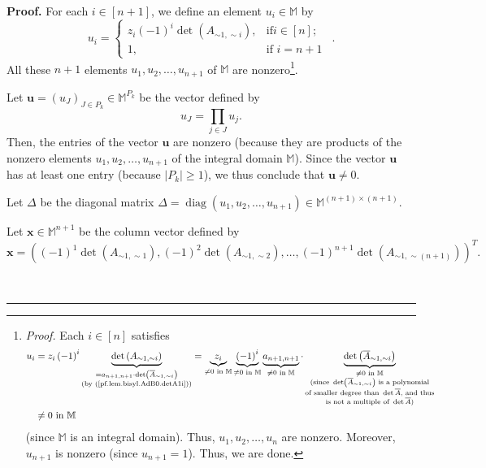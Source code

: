 \documentclass[numbers=enddot,12pt,final,onecolumn,notitlepage]{scrartcl}%
\theoremstyle{definition}
\newenvironment{proof}[1][Proof]{\noindent\textbf{#1.} }{\ \rule{0.5em}{0.5em}}
\let\prodnonlimits\prod
\renewcommand{\prod}{\prodnonlimits\limits}
\begin{document}
\begin{proof}
For each $i\in\left[  n+1\right]  $, we define an element $u_{i}\in\mathbb{M}$
by%
\[
u_{i}=%
\begin{cases}
z_{i}\left(  -1\right)  ^{i}\det\left(  A_{\sim1,\sim i}\right)  , & \text{if
}i\in\left[  n\right]  ;\\
1, & \text{if }i=n+1
\end{cases}
\ \ .
\]
All these $n+1$ elements $u_{1},u_{2},\ldots,u_{n+1}$ of $\mathbb{M}$ are
nonzero\footnote{\textit{Proof.} Each $i\in\left[  n\right]  $ satisfies%
\begin{align*}
u_{i}  &  =z_{i}\left(  -1\right)  ^{i}\underbrace{\det\left(  A_{\sim1,\sim
i}\right)  }_{\substack{=a_{n+1,n+1}\cdot\det\left(  \overline{A}_{\sim1,\sim
i}\right)  \\\text{(by (\ref{pf.lem.bisyl.AdB0.detA1i}))}}}=\underbrace{z_{i}%
}_{\neq0\text{ in }\mathbb{M}}\underbrace{\left(  -1\right)  ^{i}}%
_{\neq0\text{ in }\mathbb{M}}\underbrace{a_{n+1,n+1}}_{\neq0\text{ in
}\mathbb{M}}\cdot\underbrace{\det\left(  \overline{A}_{\sim1,\sim i}\right)
}_{\substack{\neq0\text{ in }\mathbb{M}\\\text{(since }\det\left(
\overline{A}_{\sim1,\sim i}\right)  \text{ is a polynomial}\\\text{of smaller
degree than }\det\overline{A}\text{, and thus}\\\text{is not a multiple of
}\det\overline{A}\text{)}}}\\
&  \neq0\text{ in }\mathbb{M}%
\end{align*}
(since $\mathbb{M}$ is an integral domain). Thus, $u_{1},u_{2},\ldots,u_{n}$
are nonzero. Moreover, $u_{n+1}$ is nonzero (since $u_{n+1}=1$). Thus, we are
done.}.

Let $\mathbf{u}=\left(  u_{J}\right)  _{J\in P_{k}}\in\mathbb{M}^{P_{k}}$ be
the vector defined by%
\[
u_{J}=\prod_{j\in J}u_{j}.
\]
Then, the entries of the vector $\mathbf{u}$ are nonzero (because they are
products of the nonzero elements $u_{1},u_{2},\ldots,u_{n+1}$ of the integral
domain $\mathbb{M}$). Since the vector $\mathbf{u}$ has at least one entry
(because $\left\vert P_{k}\right\vert \geq1$), we thus conclude that
$\mathbf{u}\neq0$.

Let $\Delta$ be the diagonal matrix $\Delta=\operatorname*{diag}\left(
u_{1},u_{2},\ldots,u_{n+1}\right)  \in\mathbb{M}^{\left(  n+1\right)
\times\left(  n+1\right)  }$.

Let $\mathbf{x}\in\mathbb{M}^{n+1}$ be the column vector defined by%
\[
\mathbf{x}=\left(  \left(  -1\right)  ^{1}\det\left(  A_{\sim1,\sim1}\right)
,\left(  -1\right)  ^{2}\det\left(  A_{\sim1,\sim2}\right)  ,\ldots,\left(
-1\right)  ^{n+1}\det\left(  A_{\sim1,\sim\left(  n+1\right)  }\right)
\right)  ^{T}.
\]



\end{proof}
\end{document}
